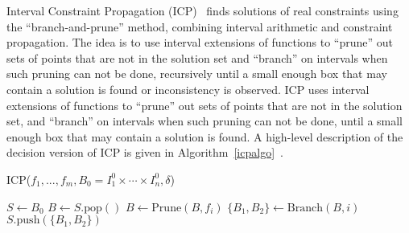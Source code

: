 \documentclass{llncs}
\begin{document}
Interval Constraint Propagation (ICP)~\cite{handbookICP} finds
solutions of real constraints using the ``branch-and-prune'' method, combining
interval arithmetic and constraint propagation. The idea is to use interval
extensions of functions to ``prune'' out sets of points that are not in the
solution set and ``branch'' on intervals when
such pruning can not be done, recursively until a small enough box
that may contain a solution is found or inconsistency is observed. ICP uses interval extensions of functions to ``prune'' out sets of points that are not in the solution set, and ``branch'' on intervals when such pruning can not be done, until a small enough box that may contain a solution is found. A high-level description of the decision version of ICP is given in Algorithm~\ref{icpalgo}~\cite{handbookICP,DBLP:conf/cade/GaoAC12}.
\begin{algorithm}\label{algo1}
\caption{ICP($f_1,...,f_m, B_0 = I_1^0\times\cdots\times I_n^0, \delta$)}\label{icpalgo}
\begin{algorithmic}[1]
\Statex
    \State $S \gets B_0$
        \State $B \gets S.\mathrm{pop}()$
        \State $B \gets \mathrm{Prune}(B, f_i)$
        \EndWhile
                \State $\{B_1,B_2\} \gets \mathrm{Branch}(B, i)$
                \State $S.\mathrm{push}(\{B_1,B_2\})$
            \Else
                \State {}
            \EndIf
        \EndIf
    \EndWhile
    \State {}
\end{algorithmic}
\end{algorithm}
\end{document}
